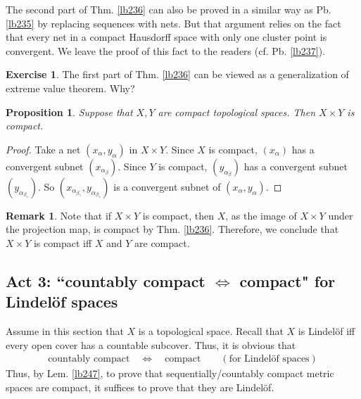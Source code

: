 \documentclass[12pt,b5paper,notitlepage]{article}
\theoremstyle{definition}
\newtheorem{exe}[df]{Exercise}
\newtheorem{rem}[df]{Remark}
\theoremstyle{plain}
\newtheorem{pp}[df]{Proposition}
\numberwithin{equation}{section}
\begin{document}
The second part of Thm. \ref{lb236} can also be proved in a similar way as Pb. \ref{lb235} by replacing sequences with nets. But that argument relies on the fact that every net in a compact Hausdorff space with only one cluster point is convergent. We leave the proof of this fact to the readers (cf. Pb. \ref{lb237}).


\begin{exe}
The first part of Thm. \ref{lb236} can be viewed as a generalization of extreme value theorem. Why?
\end{exe}



\begin{pp}\label{lb239}
Suppose that $X,Y$ are compact topological spaces. Then $X\times Y$ is compact.
\end{pp}

\begin{proof}
Take a net $(x_\alpha,y_\alpha)$ in $X\times Y$. Since $X$ is compact, $(x_\alpha)$ has a convergent subnet $(x_{\alpha_\beta})$. Since $Y$ is compact,  $(y_{\alpha_\beta})$ has a convergent subnet $(y_{\alpha_{\beta_\gamma}})$. So $(x_{\alpha_{\beta_\gamma}},y_{\alpha_{\beta_\gamma}})$ is a convergent subnet of $(x_\alpha,y_\alpha)$.
\end{proof}

\begin{rem}
Note that if $X\times Y$ is compact, then $X$, as the image of $X\times Y$ under the projection map, is compact by Thm. \ref{lb236}. Therefore, we conclude that $X\times Y$ is compact iff $X$ and $Y$ are compact.
\end{rem}










\subsection{Act 3: ``countably compact $\Leftrightarrow$ compact" for Lindel\"of spaces}\label{lb253}


Assume in this section that $X$ is a topological space. Recall that $X$ is Lindel\"of iff every open cover has a countable subcover. Thus, it is obvious that
\begin{align}
\text{countably compact}\quad\Longleftrightarrow\quad \text{compact}\qquad(\text{for Lindel\"of spaces})
\end{align}
Thus, by Lem. \ref{lb247}, to prove that sequentially/countably compact metric spaces are compact, it suffices to prove that they are Lindel\"of.
\end{document}

